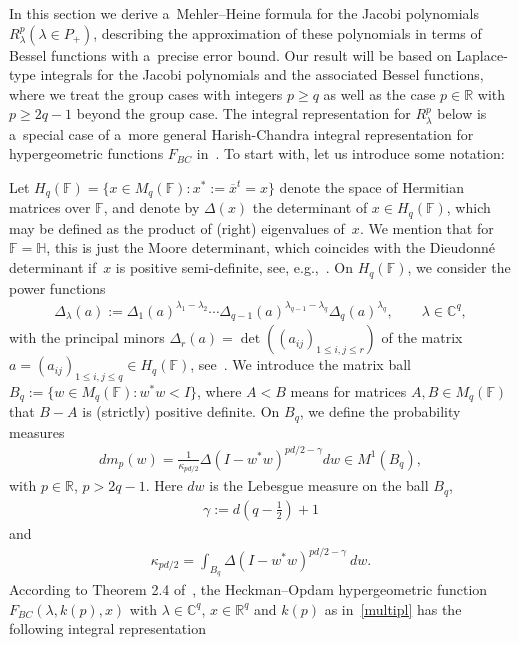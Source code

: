 \documentclass[11pt]{article}
\numberwithin{equation}{section}
\begin{document}
In this section we derive a~Mehler--Heine formula for the Jacobi polynomials $R_\lambda^p (\lambda \in P_+)$, describing
the approximation of these polynomials in terms of Bessel functions with a~precise error bound.
Our result will be based on Laplace-type integrals for the Jacobi polynomials and the associated Bessel functions, where
we treat the group cases with integers $p\ge q$ as well as the case $p\in\mathbb R$ with $p\ge 2q-1$ beyond the group
case.
The integral representation for $R_{\lambda}^p$ below is a~special case of a~more general Harish-Chandra integral
representation for hypergeometric functions $F_{BC}$ in~\cite{RV2}.
To start with, let us introduce some notation:

Let $H_q(\mathbb F)=\{x\in M_q(\mathbb F): x^*:= \overline x^t=x\}$ denote the space of Hermitian matrices over
$\mathbb F$, and denote by $\Delta(x)$ the determinant of $x\in H_q(\mathbb F)$, which may be def\/ined as the product of
(right) eigenvalues of~$x$.
We mention that for $\mathbb F=\mathbb H$, this is just the Moore determinant, which coincides with the Dieudonn\'e
determinant if~$x$ is positive semi-def\/inite, see, e.g.,~\cite{A}.
On $H_q(\mathbb F)$, we consider the power functions
\begin{gather*}
\Delta_\lambda(a):= \Delta_1(a)^{\lambda_1-\lambda_2}   \cdots   \Delta_{q-1}(a)^{\lambda_{q-1}-\lambda_q} \Delta_q(a)^{\lambda_{q}},
\qquad
\lambda \in \mathbb C^q,
\end{gather*}
with the principal minors $\Delta_r(a)=\det ((a_{ij})_{1\leq i,j\leq r}) $ of the matrix $a=(a_{ij})_{1\leq i,j\leq
q}\in H_q(\mathbb F)$, see~\cite{FK}.
We introduce the matrix ball $ B_q:= \{w\in M_q(\mathbb F): w^*w < I\}$, where $A<B$ means for matrices $A,B\in
M_q(\mathbb F)$ that $B-A$ is (strictly) positive def\/inite.
On $B_q$, we def\/ine the probability measures
\begin{gather*}
dm_p(w)=\frac{1}{\kappa_{pd/2}} \Delta(I-w^*w)^{pd/2-\gamma}dw
\in M^1(B_q),
\end{gather*}
with $p\in \mathbb R$, $p>2q-1$.
Here $dw$ is the Lebesgue measure on the ball $B_q$,
\begin{gather*}
\gamma:= d\left(q-\frac{1}{2}\right)+1
\end{gather*}
and
\begin{gather*}
\kappa_{pd/2}= \int_{B_q} \Delta(I-w^*w)^{pd/2-\gamma}\> dw.
\end{gather*}
According to Theorem 2.4 of~\cite{RV2}, the Heckman--Opdam hypergeometric function $F_{BC}(\lambda, k(p),x)$ with
$\lambda \in \mathbb C^q$, $x\in \mathbb R^q$ and $k(p)$ as in~\eqref{multipl} has the following integral representation
\end{document}
